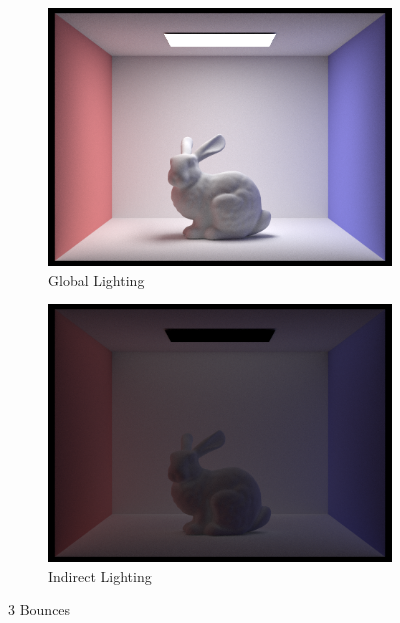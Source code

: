 \documentclass{article}
\begin{document}
\begin{figure}[htb!]
\begin{subfigure}[h]{0.4\textwidth}
\includegraphics[width=\textwidth]{task4/CBbunny_global_1024_3.png}
\caption{Global Lighting}
\end{subfigure}
\hfill\vrule\hfill
\begin{subfigure}[h]{0.4\textwidth}
\includegraphics[width=\textwidth]{task4/CBbunny_indirect_1024_3.png}
\caption{Indirect Lighting}
\end{subfigure}%

\caption[f2]{3 Bounces}
\end{figure}
\end{document}
